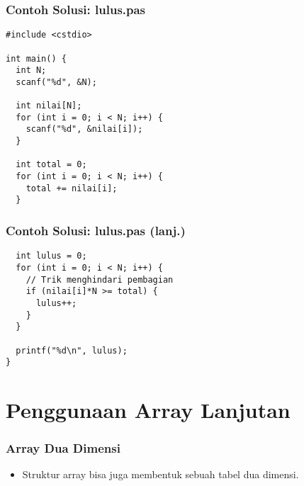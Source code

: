 \begin{frame}[fragile]
\frametitle{Contoh Solusi: lulus.pas}
\begin{lstlisting}
#include <cstdio>

int main() {
  int N;
  scanf("%d", &N);

  int nilai[N];
  for (int i = 0; i < N; i++) {
    scanf("%d", &nilai[i]);
  }

  int total = 0;
  for (int i = 0; i < N; i++) {
    total += nilai[i];
  }
\end{lstlisting}
\end{frame}

\begin{frame}[fragile]
\frametitle{Contoh Solusi: lulus.pas (lanj.)}
\begin{lstlisting}
  int lulus = 0;
  for (int i = 0; i < N; i++) {
    // Trik menghindari pembagian
    if (nilai[i]*N >= total) {
      lulus++;
    }
  }

  printf("%d\n", lulus);
}
\end{lstlisting}
\end{frame}

\section{Penggunaan Array Lanjutan}
\frame{\sectionpage}

\begin{frame}[fragile]
\frametitle{Array Dua Dimensi}
\begin{itemize}
  \item Struktur array bisa juga membentuk sebuah tabel dua dimensi.
  \item Perhatikan contoh deklarasi berikut:
\begin{lstlisting}
int matriks[2][5];
\end{lstlisting}
  \item Kini kita mendapatkan variabel bernama $matriks[a][b]$, yang terdefinisi untuk $0 \le a \le 1$ dan $0 \le b \le 4$.
\end{itemize}
\end{frame}

